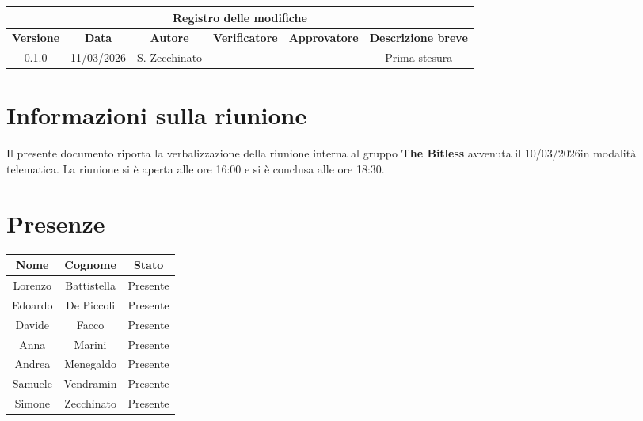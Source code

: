 \documentclass[a4paper, 10pt, colorlinks=true, linkcolor=black, urlcolor=blue, citecolor=blue, hidelinks]{article}
\begin{document}
\newcommand{\tipoverbale}{interno}
\newcommand{\dataverbale}{10/03/2026}
\newcommand{\dataversione}{11/03/2026}
\newcommand{\stato}{Stesura}
\newcommand{\destinatari}{The Bitless, prof. Tullio Vardanega, prof. Riccardo Cardin}




\newpage

\begin{center}
    \begin{tabular}{|c|c|c|c|c|c|}
                    \hline
                    \multicolumn{6}{|c|}{\textbf{Registro delle modifiche}} \\
                    \hline
                    \textbf{Versione} & \textbf{Data} & \textbf{Autore}  & \textbf{Verificatore} & \textbf{Approvatore} & \textbf{Descrizione breve} \\
                    \hline 
                    0.1.0 & \dataversione & S. Zecchinato &  -  & - & Prima stesura \\
                    \hline
                \end{tabular}
\end{center}

\newpage

\tableofcontents %


\newpage
\section{Informazioni sulla riunione}
Il presente documento riporta la verbalizzazione della riunione interna al gruppo \textbf{The Bitless} avvenuta il \dataverbale in modalità telematica. La riunione si è aperta alle ore 16:00 e si è conclusa alle ore 18:30.

\section{Presenze}
\begin{center}
    \begin{tabular}{|c|c|c|}
        \hline
        \textbf{Nome} & \textbf{Cognome} & \textbf{Stato} \\
        \hline
        Lorenzo & Battistella & Presente \\
        \hline
        Edoardo & De Piccoli & Presente \\
        \hline
        Davide & Facco & Presente \\
        \hline
        Anna & Marini & Presente \\
        \hline
        Andrea & Menegaldo & Presente \\
        \hline
        Samuele & Vendramin & Presente \\
        \hline
        Simone & Zecchinato & Presente \\
        \hline
    \end{tabular}
\end{center}
\end{document}
